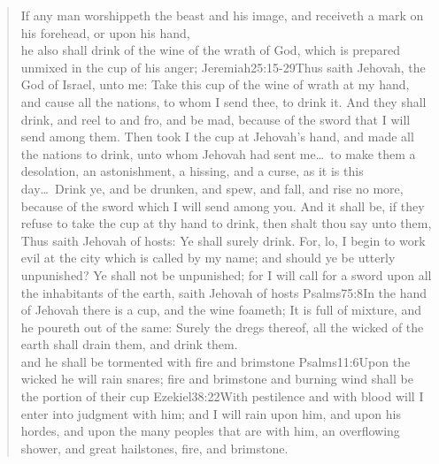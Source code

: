 \begin{verse}
If any man worshippeth the beast and his image, and receiveth a mark on his forehead, or upon his hand,\\
he also shall drink of the wine of the wrath of God, which is prepared unmixed in the cup of his anger;%
				   {Jeremiah}{25:15-29}{Thus saith Jehovah, the God of Israel, unto me: Take this cup of the wine of wrath at my hand, and cause all the nations, to whom I send thee, to drink it. And they shall drink, and reel to and fro, and be mad, because of the sword that I will send among them. Then took I the cup at Jehovah’s hand, and made all the nations to drink, unto whom Jehovah had sent me\ldots\ to make them a desolation, an astonishment, a hissing, and a curse, as it is this day\ldots\ Drink ye, and be drunken, and spew, and fall, and rise no more, because of the sword which I will send among you. And it shall be, if they refuse to take the cup at thy hand to drink, then shalt thou say unto them, Thus saith Jehovah of hosts: Ye shall surely drink. For, lo, I begin to work evil at the city which is called by my name; and should ye be utterly unpunished? Ye shall not be unpunished; for I will call for a sword upon all the inhabitants of the earth, saith Jehovah of hosts}%
				   {Psalms}{75:8}{In the hand of Jehovah there is a cup, and the wine foameth; It is full of mixture, and he poureth out of the same: Surely the dregs thereof, all the wicked of the earth shall drain them, and drink them.}\\
and he shall be tormented with fire and brimstone%
					{Psalms}{11:6}{Upon the wicked he will rain snares; fire and brimstone and burning wind shall be the portion of their cup}%
					{Ezekiel}{38:22}{With pestilence and with blood will I enter into judgment with him; and I will rain upon him, and upon his hordes, and upon the many peoples that are with him, an overflowing shower, and great hailstones, fire, and brimstone.} %

\end{verse}
